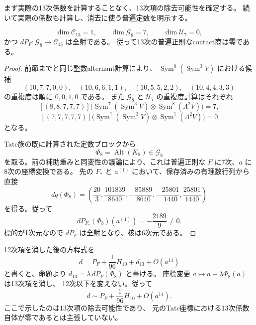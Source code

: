 まず実際の13次係数を計算することなく、13次項の除去可能性を確定する。
続いて実際の係数も計算し、消去に使う普遍定数を明示する。
\begin{proposition}[13次contact商の消滅]
\label{prop:v10-degree-thirteen}
\[
 \dim\mathcal C_{13}=1,\qquad
 \dim\mathcal G_8=7,\qquad
 \dim\mathcal U_7=0,
\]
かつ $dP_F\colon\mathcal G_8\to\mathcal C_{13}$ は全射である。
従って13次の普遍正則なcontact商は零である。
\end{proposition}
\begin{proof}
前節までと同じ整数alternant計算により、
$\operatorname{Sym}^8(\operatorname{Sym}^3V)$ における候補
\[
 (10,7,7,0,0),\quad(10,6,6,1,1),\quad
 (10,5,5,2,2),\quad(10,4,4,3,3)
\]
の重複度は順に $0,0,1,0$ である。
また $\mathcal G_8$ と $\mathcal U_7$ の重複度計算はそれぞれ
\[
 [(8,8,7,7,7)]\bigl(
 \operatorname{Sym}^7(\operatorname{Sym}^3V)
 \otimes\operatorname{Sym}^8(\Lambda^2V)\bigr)=7,
\]
\[
 [(7,7,7,7,7)]\bigl(
 \operatorname{Sym}^7(\operatorname{Sym}^3V)
 \otimes\operatorname{Sym}^7(\Lambda^2V)\bigr)=0
\]
となる。

Tate族の既に計算された定数ブロックから
\[
 \Phi_8=\operatorname{Alt}(K_8)\in\mathcal G_8
\]
を取る。前の補助重みと同変性の議論により、これは普遍正則な
$F$ に7次、$a$ に8次の座標変換である。
先の $F_*$ と $a^{(1)}$ において、保存済みの有理数行列から直接
\[
 dq(\Phi_8)=
 \left(\frac{20}{3},\frac{101839}{8640},
 -\frac{85889}{8640},-\frac{25801}{1440},
 \frac{25801}{1440}\right)
\]
を得る。従って
\[
 \boxed{dP_{F_*}(\Phi_8)(a^{(1)})=-\frac{2189}{9}\ne0.}
\]
標的が1次元なので $dP_F$ は全射となり、核は6次元である。
\end{proof}

12次項を消した後の方程式を
\[
 d=P_F+\frac1{96}H_{10}+d_{13}+O(a^{14})
\]
と書くと、命題より $d_{13}=\lambda\,dP_F(\Phi_8)$ と書ける。
座標変更 $a\mapsto a-\lambda\Phi_8(a)$ は13次項を消し、
12次以下を変えない。従って
\[
 \boxed{d\sim P_F+\frac1{96}H_{10}+O(a^{14}).}
\]
ここで示したのは13次項の除去可能性であり、
元のTate座標における13次係数自体が零であるとは主張していない。


